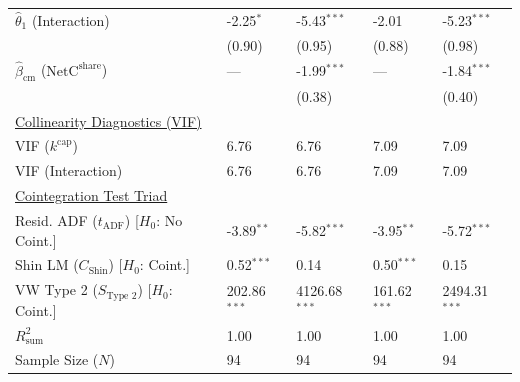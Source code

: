 \begin{table}[H]
\begin{tabular}{p{3.8cm}p{1.35cm}p{1.35cm}p{1.35cm}p{1.35cm}}
$\hat{\theta}_1$ (Interaction)  & -2.25$^{*}$ & -5.43$^{***}$ & -2.01 & -5.23$^{***}$  \\
 & {\scriptsize (0.90)} & {\scriptsize (0.95)} & {\scriptsize (0.88)} & {\scriptsize (0.98)}  \\
$\hat{\beta}_{\text{cm}}$ ($\text{NetC}^{\text{share}}$)  & --- & -1.99$^{***}$ & --- & -1.84$^{***}$  \\
 &  & {\scriptsize (0.38)} &  & {\scriptsize (0.40)}  \\
\midrule
\multicolumn{5}{l}{\underline{Collinearity Diagnostics (VIF)}} \\
VIF ($k^{\text{cap}}$) & 6.76 & 6.76 & 7.09 & 7.09  \\
VIF (Interaction) & 6.76 & 6.76 & 7.09 & 7.09  \\
\midrule
\multicolumn{5}{l}{\underline{Cointegration Test Triad}} \\
\makecell[l]{Resid. ADF ($t_{\text{ADF}}$) \\ {\scriptsize [$H_0$: No Coint.]}} & -3.89$^{**}$ & -5.82$^{***}$ & -3.95$^{**}$ & -5.72$^{***}$  \\
\makecell[l]{Shin LM ($C_{\text{Shin}}$) \\ {\scriptsize [$H_0$: Coint.]}} & 0.52$^{***}$ & 0.14 & 0.50$^{***}$ & 0.15  \\
\makecell[l]{VW Type 2 ($S_{\text{Type 2}}$) \\ {\scriptsize [$H_0$: Coint.]}} & 202.86$^{***}$ & 4126.68$^{***}$ & 161.62$^{***}$ & 2494.31$^{***}$  \\
\midrule
$R^2_{\text{sum}}$ & 1.00 & 1.00 & 1.00 & 1.00  \\
Sample Size ($N$) & 94 & 94 & 94 & 94  \\
\bottomrule

\end{tabular}
\end{table}
